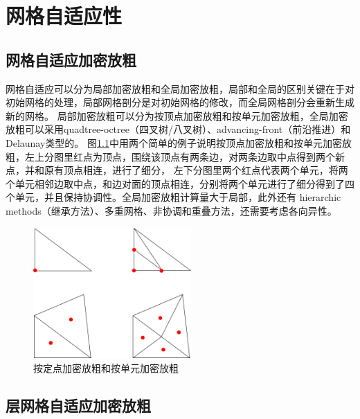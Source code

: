 \chapter{网格自适应性}

\section{网格自适应加密放粗}

网格自适应可以分为局部加密放粗和全局加密放粗，局部和全局的区别关键在于对初始网格的处理，局部网格剖分是对初始网格的修改，而全局网格剖分会重新生成新的网格。
局部加密放粗可以分为按顶点加密放粗和按单元加密放粗，全局加密放粗可以采用quadtree-octree（四叉树/八叉树）、advancing-front（前沿推进）和Delaunay类型的。
图\ref{fig:2-1}中用两个简单的例子说明按顶点加密放粗和按单元加密放粗，左上分图里红点为顶点，围绕该顶点有两条边，对两条边取中点得到两个新点，并和原有顶点相连，进行了细分，
左下分图里两个红点代表两个单元，将两个单元相邻边取中点，和边对面的顶点相连，分别将两个单元进行了细分得到了四个单元，并且保持协调性。全局加密放粗计算量大于局部，此外还有
hierarchic methods（继承方法）、多重网格、非协调和重叠方法，还需要考虑各向异性。

\begin{figure}[!htbp]
  \centering
  \includegraphics[height=5cm]{fig/2/1.png}
  \caption{按定点加密放粗和按单元加密放粗}
  \label{fig:2-1}
\end{figure}


\section{层网格自适应加密放粗}
